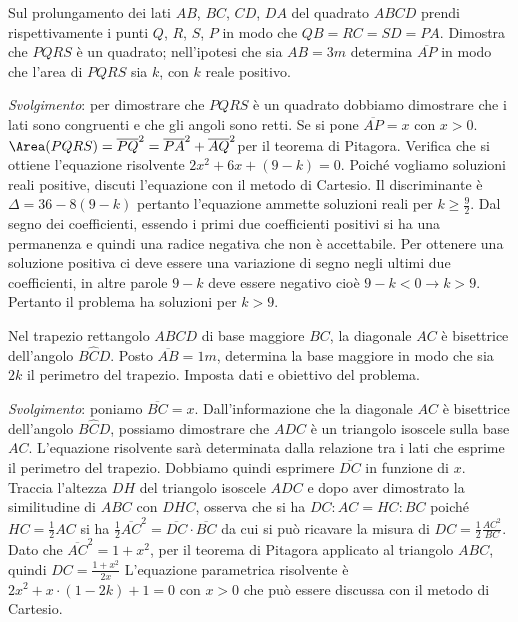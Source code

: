 \begin{multicols}{2}
\begin{esercizio}
 \label{ese:3.151}
Sul prolungamento dei lati $ AB $, $ BC $, $ CD $, $ DA $ del quadrato $ ABCD $ prendi rispettivamente i punti $ Q $, $ R $, $ S $, $ P $ in modo che $ QB=RC=SD=PA $. Dimostra che $ PQRS $ è un quadrato; nell’ipotesi che sia $AB = 3\unit{m}$ determina $\overline {AP}$ in modo che l’area di $ PQRS $ sia $ k $, con $ k $ reale positivo.
\begin{center}
 
\end{center}
\emph{Svolgimento}:
per dimostrare che $ PQRS $ è un quadrato dobbiamo dimostrare che i lati sono
congruenti e che gli angoli sono retti. Se si pone $\overline{AP} = x$ con $x > 0$.
$\Area(PQRS)= \overline {PQ}^{2} = \overline {PA}^{2} + \overline{AQ}^{2}$per il teorema di Pitagora.
Verifica che si ottiene l’equazione risolvente $2 x^{2} + 6 x + (9-k) = 0$. Poiché vogliamo soluzioni reali positive, discuti l’equazione con il metodo di Cartesio. Il discriminante è $\Delta = 36-8 (9-k)$ pertanto l'equazione ammette soluzioni reali per $k \geq \frac{9}{2}$. Dal segno dei coefficienti, essendo i primi due coefficienti positivi si ha una permanenza e quindi una radice negativa che non è accettabile. Per ottenere una soluzione positiva ci deve essere una variazione di segno negli ultimi due coefficienti, in altre parole $9-k$ deve essere negativo cioè $9-k < 0 \rightarrow k > 9$. Pertanto il problema ha soluzioni per $k > 9$.
\end{esercizio}

\begin{esercizio}
 \label{ese:3.152}
Nel trapezio rettangolo $ ABCD $ di base maggiore $ BC $, la diagonale $ AC $ è bisettrice dell’angolo $B \widehat {C} D$. Posto $\overline {AB} = 1\unit{m}$, determina la base maggiore in modo che sia $ 2k $ il perimetro del trapezio. Imposta dati e obiettivo del problema.
\begin{center}
 
\end{center}
\emph{Svolgimento}: poniamo $\overline {BC} = x$. Dall’informazione che la diagonale $ AC $ è bisettrice dell’angolo $B \widehat {C} D$, possiamo dimostrare che $ ADC $ è un triangolo isoscele sulla base $ AC $. L’equazione risolvente sarà determinata dalla relazione tra i lati che esprime il perimetro del trapezio. Dobbiamo quindi esprimere $\overline {DC}$ in funzione di $ x $. Traccia l’altezza $ DH $ del triangolo isoscele $ ADC $ e dopo aver dimostrato la similitudine di $ ABC $ con $ DHC $, osserva che si ha $DC : AC = HC : BC$ poiché $HC = \frac{1}{2} AC$ si ha $\frac{1}{2} \overline {AC}^{2} = \overline {DC} \cdot \overline {BC}$ da cui si può ricavare la misura di $ DC = \frac{1}{2} \frac{AC^{2}}{BC}$. Dato che $\overline {AC}^{2}=1+x^2$, per il teorema di Pitagora applicato al triangolo $ ABC $, quindi $ DC = \frac{1 + x^2} {2 x} $ L’equazione parametrica risolvente è $2 x^{2} + x \cdot (1-2 k) + 1 = 0$ con $x > 0$ che può essere discussa con il metodo di Cartesio.
\end{esercizio}


\end{multicols}
